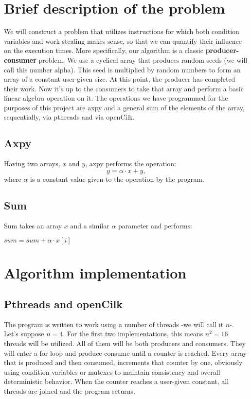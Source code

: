 \documentclass[11pt,a4paper,onecolumn,final]{article}
\begin{document}
\section{Brief description of the problem}
We will construct a problem that utilizes instructions for which both condition variables and work stealing makes sense, so that we can quantify their influence on the execution times. More specifically, our algorithm is a classic \textbf{producer-consumer} problem. We use a cyclical array that produces random seeds (we will call this number alpha). This seed is multiplied by random numbers to form an array of a constant user-given size. At this point, the producer has completed their work. Now it’s up to the consumers to take that array and perform a basic linear algebra operation on it. The operations we have programmed for the purposes of this project are axpy and a general sum of the elements of the array, sequentially, via pthreads and via openCilk. 
\subsection{Axpy}
Having two arrays, $x$ and $y$, axpy performs the operation:
\begin{equation}
y=\alpha\cdot x+y,
\end{equation}
where $\alpha$ is a constant value given to the operation by the program.
\subsection{Sum}
Sum takes an array $x$ and a similar $\alpha$ parameter and performs:
\begin{algorithmic}
	\State $sum=sum+\alpha\cdot x[i]$
\EndFor
\end{algorithmic}
\section{Algorithm implementation}
\subsection{Pthreads and openCilk}
The program is written to work using a number of threads -we will call it $n$-. Let’s suppose $n=4$. For the first two implementations, this means $n^{2}=16$ threads will be utilized. All of them will be both producers and consumers. They will enter a for loop and produce-consume until a counter is reached. Every array that is produced and then consumed, increments that counter by one, obviously using condition variables or mutexes to maintain consistency and overall deterministic behavior. When the counter reaches a user-given constant, all threads are joined and the program returns.
\end{document}
